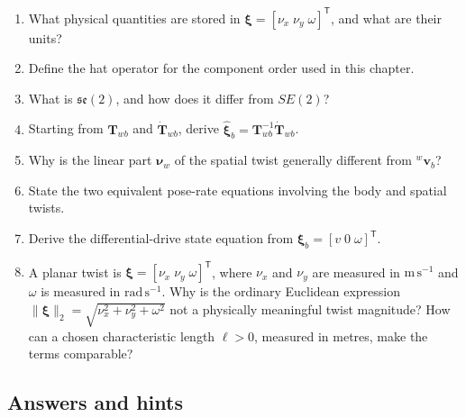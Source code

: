 \documentclass[
  australian,
  12pt,
  letterpaper,
  DIV=11,
  numbers=noendperiod,
  twoside]{scrreprt}
\providecommand{\tightlist}{%
  \setlength{\itemsep}{0pt}\setlength{\parskip}{0pt}}
\begin{document}
\begin{enumerate}
\def\labelenumi{\arabic{enumi}.}
\tightlist
\item
  What physical quantities are stored in
  \(\boldsymbol\xi=[\nu_x\;\nu_y\;\omega]^\mathsf T\), and what are
  their units?
\item
  Define the hat operator for the component order used in this chapter.
\item
  What is \(\mathfrak{se}(2)\), and how does it differ from \(SE(2)\)?
\item
  Starting from \(\mathbf T_{wb}\) and \(\dot{\mathbf T}_{wb}\), derive
  \(\widehat{\boldsymbol\xi}_b=\mathbf T_{wb}^{-1}\dot{\mathbf T}_{wb}\).
\item
  Why is the linear part \(\boldsymbol\nu_w\) of the spatial twist
  generally different from \({}^w\mathbf v_b\)?
\item
  State the two equivalent pose-rate equations involving the body and
  spatial twists.
\item
  Derive the differential-drive state equation from
  \(\boldsymbol\xi_b=[v\;0\;\omega]^\mathsf T\).
\item
  A planar twist is \(\boldsymbol\xi=[\nu_x\;\nu_y\;\omega]^\mathsf T\),
  where \(\nu_x\) and \(\nu_y\) are measured in \(\mathrm{m\,s^{-1}}\)
  and \(\omega\) is measured in \(\mathrm{rad\,s^{-1}}\). Why is the
  ordinary Euclidean expression
  \(\lVert\boldsymbol\xi\rVert_2=\sqrt{\nu_x^2+\nu_y^2+\omega^2}\) not a
  physically meaningful twist magnitude? How can a chosen characteristic
  length \(\ell>0\), measured in metres, make the terms comparable?
\end{enumerate}

\subsection*{Answers and hints}\label{answers-and-hints-13}
\end{document}
